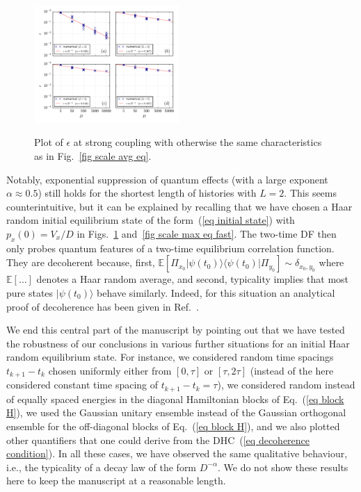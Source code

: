\documentclass[pre,onecolumn,12pt,aps,longbibliography,nofootinbib]{revtex4-2}
\newcommand{\rl}[0]{{\rangle\langle}}
\newcommand{\new}[1]{#1}
\begin{document}
\begin{figure}[t]
 \centering\includegraphics[width=0.49\textwidth,clip=true]{eps_1_eq.pdf}
 \label{fig scale avg eq fast}\vspace{-0.5cm}
 \caption{Plot of $\epsilon$ at strong coupling with otherwise the same characteristics as in Fig.~\ref{fig scale avg eq}. }
\end{figure}

Notably, exponential suppression of quantum effects (with a large exponent $\alpha\approx0.5$) still
holds for the shortest length of histories with $L=2$. This seems counterintuitive, but it can be explained by
recalling that we have chosen a Haar random initial equilibrium state of the form~(\ref{eq initial state}) with
$p_x(0) = V_x/D$ in Figs.~\ref{fig scale avg eq fast} and~\ref{fig scale max eq fast}.
The two-time DF then only probes quantum features of a two-time equilibrium correlation function. They are \new{decoherent} because, first, $\mathbb{E}[\Pi_{x_0}|\psi(t_0)\rl\psi(t_0)|\Pi_{y_0}] \sim \delta_{x_0,y_0}$ where
$\mathbb{E}[\dots]$ denotes a Haar random average, and second, typicality implies that most pure states
$|\psi(t_0)\rangle$ behave similarly. Indeed, for this situation an analytical proof of \new{decoherence} has been given
in Ref.~\cite{StrasbergEtAlPRA2023}.

We end this central part of the manuscript by pointing out that we have tested the robustness of our conclusions
in various further situations for an initial Haar random equilibrium state. For instance, we considered random time 
spacings $t_{k+1}-t_{k}$ chosen uniformly either from $[0,\tau]$ or $[\tau,2\tau]$ (instead of the here considered 
constant time spacing of $t_{k+1}-t_{k} = \tau$), we considered random instead of equally spaced energies in the 
diagonal Hamiltonian blocks of Eq.~(\ref{eq block H}), we used the Gaussian unitary ensemble instead of the Gaussian 
orthogonal ensemble for the off-diagonal blocks of Eq.~(\ref{eq block H}), and we also plotted other quantifiers that 
one could derive from the DHC~(\ref{eq decoherence condition}). In {all} these cases, we have observed the 
{same} qualitative behaviour, i.e., the typicality of a decay law of the form $D^{-\alpha}$. We do not show these 
results here to keep the manuscript at a reasonable length.
\end{document}
